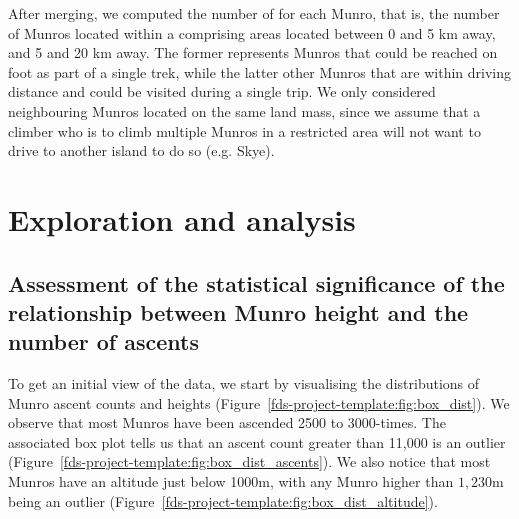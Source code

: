 \documentclass[11pt,a4paper]{article}
\begin{document}
After merging, we computed the number of  for each Munro, that is, the number of Munros located within a  comprising areas located between 0 and 5 km away, and 5 and 20 km away. The former represents Munros that could be reached on foot as part of a single trek, while the latter other Munros that are within driving distance and could be visited during a single trip. We only considered neighbouring Munros located on the same land mass, since we assume that a climber who is to climb multiple Munros in a restricted area will not want to drive to another island to do so (e.g. Skye).


\section{Exploration and  analysis}


\subsection{Assessment of the statistical significance of the relationship between Munro height and the number of ascents}
To get an initial view of the data, we start by visualising the distributions of Munro ascent counts and heights (Figure~\ref{fds-project-template:fig:box_dist}). We observe that most Munros have been ascended 2500 to 3000-times. The associated box plot tells us that an ascent count greater than 11,000 is an outlier (Figure~\ref{fds-project-template:fig:box_dist_ascents}). We also notice that most Munros have an altitude just below 1000m, with any Munro higher than $1,230$m being an outlier (Figure~\ref{fds-project-template:fig:box_dist_altitude}).
\end{document}
